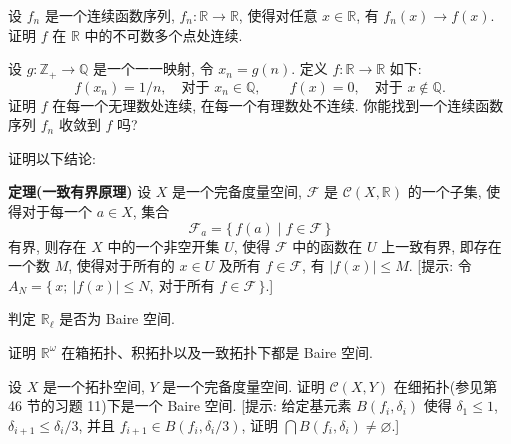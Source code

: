 \begin{exercise}
设 $f_n$ 是一个连续函数序列, $f_n\colon\mathbb{R}\to\mathbb{R}$, 使得对任意 $x\in\mathbb{R}$, 有 $f_n(x)\to f(x)$. 证明 $f$ 在 $\mathbb{R}$ 中的不可数多个点处连续.
\end{exercise}

\begin{exercise}
设 $g\colon\mathbb{Z}_{+}\to\mathbb{Q}$ 是一个一一映射, 令 $x_n=g(n)$. 定义 $f\colon\mathbb{R}\to\mathbb{R}$ 如下:
\[
f(x_{n})=1/n,\quad\text{对于 }x_{n}\in\mathbb{Q},\qquad
f(x)=0,\quad\text{对于 }x\notin\mathbb{Q}.
\]
证明 $f$ 在每一个无理数处连续, 在每一个有理数处不连续. 你能找到一个连续函数序列 $f_n$ 收敛到 $f$ 吗?
\end{exercise}

\begin{exercise}
证明以下结论:

\textbf{定理(一致有界原理)} 设 $X$ 是一个完备度量空间, $\mathcal{F}$ 是 $\mathcal{C}(X,\mathbb{R})$ 的一个子集, 使得对于每一个 $a\in X$, 集合
\[
\mathcal{F}_{a}=\{\,f(a)\mid f\in\mathcal{F}\,\}
\]
有界, 则存在 $X$ 中的一个非空开集 $U$, 使得 $\mathcal{F}$ 中的函数在 $U$ 上一致有界, 即存在一个数 $M$, 使得对于所有的 $x\in U$ 及所有 $f\in\mathcal{F}$, 有 $|f(x)|\leqslant M$. [提示: 令 $A_N=\{\,x;\ |f(x)|\leqslant N,\ \text{对于所有 }f\in\mathcal{F}\,\}$.]
\end{exercise}

\begin{exercise}
判定 $\mathbb{R}_\ell$ 是否为 Baire 空间.
\end{exercise}

\begin{exercise}
证明 $\mathbb{R}^\omega$ 在箱拓扑、积拓扑以及一致拓扑下都是 Baire 空间.
\end{exercise}

\begin{exercise}
设 $X$ 是一个拓扑空间, $Y$ 是一个完备度量空间. 证明 $\mathcal{C}(X,Y)$ 在细拓扑(参见第 46 节的习题 11)下是一个 Baire 空间. [提示: 给定基元素 $B(f_i,\delta_i)$ 使得 $\delta_1\leqslant 1$, $\delta_{i+1}\leqslant\delta_i/3$, 并且 $f_{i+1}\in B(f_i,\delta_i/3)$, 证明 $\bigcap B(f_i,\delta_i)\neq\varnothing$.]
\end{exercise}
